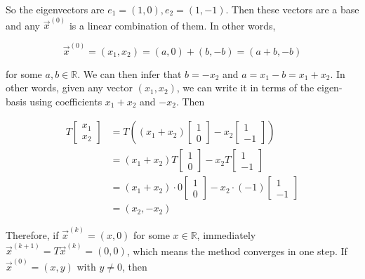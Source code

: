 \documentclass[12pt]{article}
\theoremstyle{definition}
\begin{document}
So the eigenvectors are $e_1 = (1, 0), e_2 = (1, -1)$. Then these vectors are a
base and any $\overrightarrow{x}^{(0)}$ is a linear combination of them. In
other words, 

\begin{equation*}
    \overrightarrow{x}^{(0)} = (x_1, x_2) = (a, 0) + (b, -b) = (a+b, -b)
\end{equation*}

for some $a, b \in \mathbb{R}$. We can then infer that $b = -x_2$ and $a = x_1 -
b = x_1 + x_2$. In other words, given any vector $(x_1, x_2)$, we can write it
in terms of the eigen-basis using coefficients $x_1 + x_2$ and $-x_2$. Then

\begin{align*}
    T \begin{bmatrix} 
            x_1 \\ x_2
    \end{bmatrix} 
    &= T\left( ( x_1 + x_2 ) \begin{bmatrix} 
            1 \\ 0 
    \end{bmatrix} - x_2 \begin{bmatrix} 
            1 \\ -1 
    \end{bmatrix}  \right) \\ 
    &= (x_1 + x_2) T\begin{bmatrix} 
            1 \\ 0 
    \end{bmatrix} - x_2 T\begin{bmatrix} 
            1 \\ -1 
    \end{bmatrix} \\ 
    &= (x_1 + x_2) \cdot 0 \begin{bmatrix} 
            1 \\ 0 
    \end{bmatrix} - x_2 \cdot (-1)\begin{bmatrix} 
            1 \\ -1 
    \end{bmatrix} \\ 
    &= (x_2, -x_2)
\end{align*}

Therefore, if $\overrightarrow{x}^{(k)} = (x, 0)$ for some $x \in \mathbb{R}$,
immediately $\overrightarrow{x}^{(k+1)} = T\overrightarrow{x}^{(k)} = (0,0)$,
which means the method converges in one step. If $\overrightarrow{x}^{(0)} = (x,
y)$ with $y \neq 0$, then 
\end{document}
